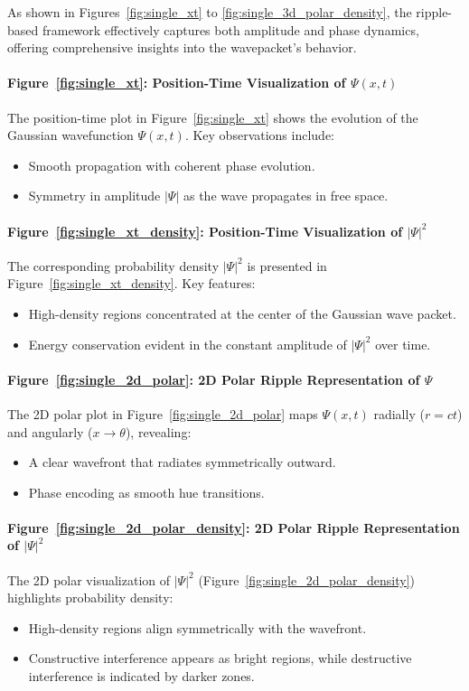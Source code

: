 \documentclass[12pt]{article}
\begin{document}
As shown in Figures~\ref{fig:single_xt} to \ref{fig:single_3d_polar_density}, the ripple-based framework effectively captures both amplitude and phase dynamics, offering comprehensive insights into the wavepacket's behavior.

\paragraph{Figure~\ref{fig:single_xt}: Position-Time Visualization of \(\Psi(x,t)\)}
The position-time plot in Figure~\ref{fig:single_xt} shows the evolution of the Gaussian wavefunction \(\Psi(x,t)\). Key observations include:
\begin{itemize}
    \item Smooth propagation with coherent phase evolution.
    \item Symmetry in amplitude \(|\Psi|\) as the wave propagates in free space.
\end{itemize}

\paragraph{Figure~\ref{fig:single_xt_density}: Position-Time Visualization of \(|\Psi|^2\)}
The corresponding probability density \(|\Psi|^2\) is presented in Figure~\ref{fig:single_xt_density}. Key features:
\begin{itemize}
    \item High-density regions concentrated at the center of the Gaussian wave packet.
    \item Energy conservation evident in the constant amplitude of \(|\Psi|^2\) over time.
\end{itemize}

\paragraph{Figure~\ref{fig:single_2d_polar}: 2D Polar Ripple Representation of \(\Psi\)}
The 2D polar plot in Figure~\ref{fig:single_2d_polar} maps \(\Psi(x,t)\) radially (\(r = ct\)) and angularly (\(x \to \theta\)), revealing:
\begin{itemize}
    \item A clear wavefront that radiates symmetrically outward.
    \item Phase encoding as smooth hue transitions.
\end{itemize}

\paragraph{Figure~\ref{fig:single_2d_polar_density}: 2D Polar Ripple Representation of \(|\Psi|^2\)}
The 2D polar visualization of \(|\Psi|^2\) (Figure~\ref{fig:single_2d_polar_density}) highlights probability density:
\begin{itemize}
    \item High-density regions align symmetrically with the wavefront.
    \item Constructive interference appears as bright regions, while destructive interference is indicated by darker zones.
\end{itemize}
\end{document}
